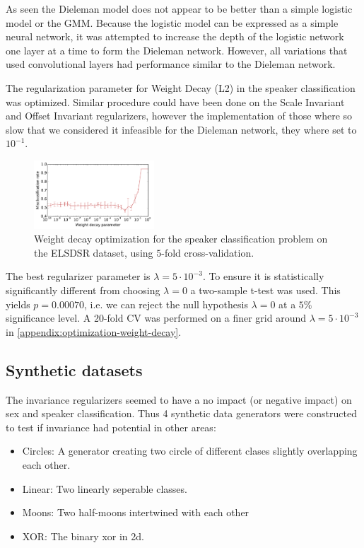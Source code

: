 As seen the Dieleman model does not appear to be better than a simple logistic model or the GMM. Because the logistic model can be expressed as a simple neural network, it was attempted to increase the depth of the logistic network one layer at a time to form the Dieleman network. However, all variations that used convolutional layers had performance similar to the Dieleman network.

The regularization parameter for Weight Decay (L2) in the speaker classification was optimized. Similar procedure could have been done on the Scale Invariant and Offset Invariant regularizers, however the implementation of those where so slow that we considered it infeasible for the Dieleman network, they where set to $10^{-1}$.

\begin{figure}[H]
  \centering
  \includegraphics[width=0.4\textwidth]{plots/reg_opt_dieleman_speaker_elsdsr}
  \caption{Weight decay optimization for the speaker classification problem on the ELSDSR dataset, using $5$-fold cross-validation.}
  \label{fig:reg_opt}
\end{figure}

The best regularizer parameter is $\lambda = 5 \cdot 10^{-3}$. To ensure it is statistically significantly different from choosing $\lambda = 0$ a two-sample t-test was used. This yields $p = 0.00070$, i.e. we can reject the null hypothesis $\lambda=0$ at a $5\%$ significance level. A 20-fold CV was performed on a finer grid around $\lambda = 5 \cdot 10^{-3}$ in \cref{appendix:optimization-weight-decay}.

\subsection{Synthetic datasets}

The invariance regularizers seemed to have a no impact (or negative impact) on sex and speaker classification. Thus 4 synthetic data generators were constructed to test if invariance had potential in other areas:
\begin{itemize}
\item{Circles: A generator creating two circle of different clases slightly overlapping each other.}
\item{Linear: Two linearly seperable classes.}
\item{Moons: Two half-moons intertwined with each other}
\item{XOR: The binary xor in 2d.}
\end{itemize}

